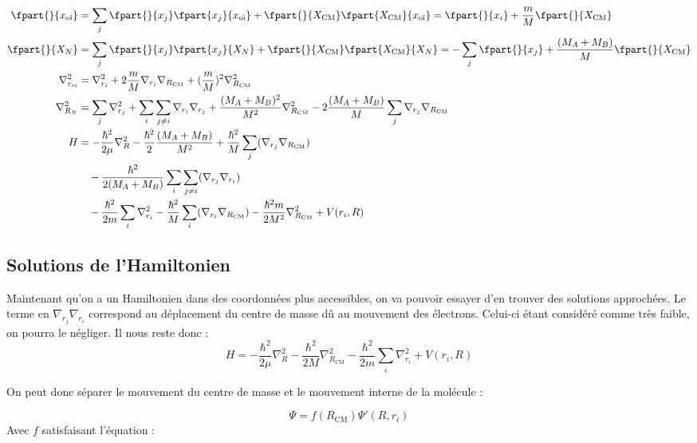 \begin{align*}
    \fpart{}{x_\text{oi}} &= \sum\limits_j\fpart{}{x_j}\fpart{x_j}{x_\text{oi}} + \fpart{}{X_\text{CM}}\fpart{X_\text{CM}}{x_\text{oi}} = \fpart{}{x_i} + \dfrac{m}{M}\fpart{}{X_\text{CM}} \\
    \fpart{}{X_N} &= \sum\limits_j\fpart{}{x_j}\fpart{x_j}{X_N} + \fpart{}{X_\text{CM}}\fpart{X_\text{CM}}{X_N} = - \sum\limits_j\fpart{}{x_j} + \dfrac{(M_A + M_B)}{M}\fpart{}{X_\text{CM}} \\
    \nabla^2_{r_\text{oi}} &= \nabla^2_{r_{i}} + 2\dfrac{m}{M}\nabla_{r_i}\nabla_{R_\text{CM}} + (\dfrac{m}{M})^2\nabla^2_{R_\text{CM}} \\
    \nabla^2_{R_N} &= \sum\limits_j\nabla^2_{r_j} + \sum\limits_i\sum\limits_{j\neq i}\nabla_{r_i}\nabla_{r_j} + \dfrac{(M_A + M_B)^2}{M^2}\nabla^2_{R_\text{CM}} - 2\dfrac{(M_A + M_B)}{M}\sum\limits_j \nabla_{r_j}\nabla_{R_\text{CM}}\\
    H &= -\dfrac{\hbar^2}{2\mu}\nabla^2_R - \dfrac{\hbar^2}{2}\dfrac{(M_A + M_B)}{M^2} + \dfrac{\hbar^2}{M}\sum\limits_j(\nabla_{r_j}\nabla_{R_\text{CM}}) \\
    &\quad -\dfrac{\hbar^2}{2(M_A + M_B)}\sum\limits_i\sum\limits_{j\neq i}(\nabla_{r_j}\nabla_{r_i}) \\
    &\quad -\dfrac{\hbar^2}{2m}\sum\limits_i \nabla^2_{r_{i}} - \dfrac{\hbar^2}{M}\sum\limits_i(\nabla_{r_i}\nabla_{R_\text{CM}}) - \dfrac{\hbar^2 m}{2M^2}\nabla^2_{R_\text{CM}} + V(r_i, R) \\
\end{align*}


\subsection{Solutions de l'Hamiltonien}\label{Solutions de l'hamiltonien}


Maintenant qu'on a un Hamiltonien dans des coordonnées plus accessibles, on va pouvoir essayer d'en trouver des solutions approchées. Le terme en $\nabla_{r_j}\nabla_{r_i}$ correspond au déplacement du centre de masse dû au mouvement des électrons. Celui-ci étant considéré comme très faible, on pourra le négliger. Il nous reste donc :
\[
    H = -\dfrac{\hbar^2}{2\mu}\nabla^2_R - \dfrac{\hbar^2}{2M}\nabla^2_{R_\text{CM}} -\dfrac{\hbar^2}{2m}\sum\limits_i \nabla^2_{r_{i}} + V(r_i, R)
\]


On peut donc séparer le mouvement du centre de masse et le mouvement interne de la molécule :


\[ \Psi = f(R_\text{CM})\Psi'(R,r_i) \]
Avec $f$ satisfaisant l'équation :


